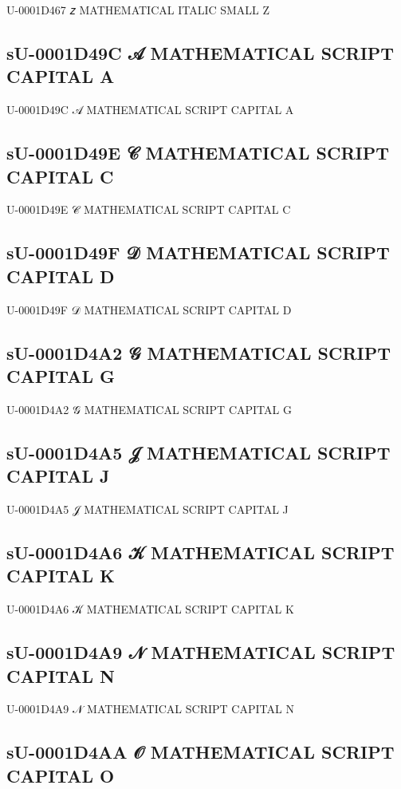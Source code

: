 U-0001D467 𝑧 MATHEMATICAL ITALIC SMALL Z

\subsection{sU-0001D49C 𝒜 MATHEMATICAL SCRIPT CAPITAL A}

U-0001D49C 𝒜 MATHEMATICAL SCRIPT CAPITAL A

\subsection{sU-0001D49E 𝒞 MATHEMATICAL SCRIPT CAPITAL C}

U-0001D49E 𝒞 MATHEMATICAL SCRIPT CAPITAL C

\subsection{sU-0001D49F 𝒟 MATHEMATICAL SCRIPT CAPITAL D}

U-0001D49F 𝒟 MATHEMATICAL SCRIPT CAPITAL D

\subsection{sU-0001D4A2 𝒢 MATHEMATICAL SCRIPT CAPITAL G}

U-0001D4A2 𝒢 MATHEMATICAL SCRIPT CAPITAL G

\subsection{sU-0001D4A5 𝒥 MATHEMATICAL SCRIPT CAPITAL J}

U-0001D4A5 𝒥 MATHEMATICAL SCRIPT CAPITAL J

\subsection{sU-0001D4A6 𝒦 MATHEMATICAL SCRIPT CAPITAL K}

U-0001D4A6 𝒦 MATHEMATICAL SCRIPT CAPITAL K

\subsection{sU-0001D4A9 𝒩 MATHEMATICAL SCRIPT CAPITAL N}

U-0001D4A9 𝒩 MATHEMATICAL SCRIPT CAPITAL N

\subsection{sU-0001D4AA 𝒪 MATHEMATICAL SCRIPT CAPITAL O}

